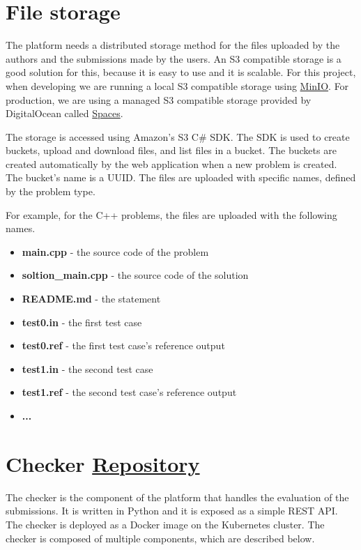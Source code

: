 \documentclass[12pt,a4paper]{report}
\begin{document}
\section{File storage}
The platform needs a distributed storage method for the files uploaded by the authors and the submissions made by the users. An S3 compatible storage is a good solution for this, because it is easy to use and it is scalable. For this project, when developing we are running a local S3 compatible storage using \href{https://min.io/}{MinIO}. For production, we are using a managed S3 compatible storage provided by DigitalOcean called \href{https://www.digitalocean.com/products/spaces/}{Spaces}.

The storage is accessed using Amazon's S3 C\# SDK. The SDK is used to create buckets, upload and download files, and list files in a bucket. The buckets are created automatically by the web application when a new problem is created. The bucket's name is a UUID. The files are uploaded with specific names, defined by the problem type.

\newpage
For example, for the C++ problems, the files are uploaded with the following names.

\begin{itemize}
	\item \textbf{main.cpp} - the source code of the problem
	\item \textbf{soltion\_main.cpp} - the source code of the solution
	\item \textbf{README.md} - the statement
	\item \textbf{test0.in} - the first test case
	\item \textbf{test0.ref} - the first test case's reference output
	\item \textbf{test1.in} - the second test case
	\item \textbf{test1.ref} - the second test case's reference output
	\item \textbf{...}
\end{itemize}

\section{Checker \href{https://github.com/acadnet-dev/checker}{ Repository}}
The checker is the component of the platform that handles the evaluation of the submissions. It is written in Python and it is exposed as a simple REST API. The checker is deployed as a Docker image on the Kubernetes cluster. The checker is composed of multiple components, which are described below.
\end{document}
